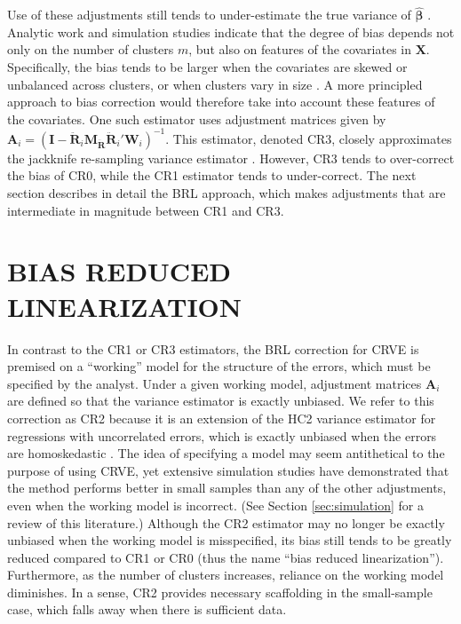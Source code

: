 \documentclass[draft]{ectaart}\usepackage[]{graphicx}\usepackage[]{color}
\newcommand{\bm}{\mathbf}
\newcommand{\bs}{\boldsymbol}
\begin{document}
Use of these adjustments still tends to under-estimate the true variance of $\hat{\bs\beta}$ \citep{Cameron2015practitioners}. 
Analytic work and simulation studies indicate that the degree of bias depends not only on the number of clusters $m$, but also on features of the covariates in $\bm{X}$. Specifically, 
the bias tends to be larger when the covariates are skewed or unbalanced across clusters, or when clusters vary in size \citep{Carter2013asymptotic, MacKinnon2013thirty}. 
A more principled approach to bias correction would therefore take into account these features of the covariates. 
One such estimator uses adjustment matrices given by $\bm{A}_i = \left(\bm{I} - \bm{\ddot{R}}_i \bm{M_{\ddot{R}}}\bm{\ddot{R}}_i'\bm{W}_i\right)^{-1}$. This estimator, denoted CR3, closely approximates the jackknife re-sampling variance estimator \citep{Bell2002bias, Mancl2001covariance}.  
However, CR3 tends to over-correct the bias of CR0, while the CR1 estimator tends to under-correct. 
The next section describes in detail the BRL approach, which makes adjustments that are intermediate in magnitude between CR1 and CR3. 


\section{BIAS REDUCED LINEARIZATION}
\label{sec:BRL}

In contrast to the CR1 or CR3 estimators, the BRL correction for CRVE is premised on a ``working'' model for the structure of the errors, which must be specified by the analyst. 
Under a given working model, adjustment matrices $\bm{A}_i$ are defined so that the variance estimator is exactly unbiased.
We refer to this correction as CR2 because it is an extension of the HC2 variance estimator for regressions with uncorrelated errors, which is exactly unbiased when the errors are homoskedastic \citep{MacKinnon1985some}.
The idea of specifying a model may seem antithetical to the purpose of using CRVE, yet extensive simulation studies have demonstrated that the method performs better in small samples than any of the other adjustments, even when the working model is incorrect. (See Section \ref{sec:simulation} for a review of this literature.) 
Although the CR2 estimator may no longer be exactly unbiased when the working model is misspecified, its bias still tends to be greatly reduced compared to CR1 or CR0 (thus the name ``bias reduced linearization''). Furthermore, as the number of clusters increases, reliance on the working model diminishes. 
In a sense, CR2 provides necessary scaffolding in the small-sample case, which falls away when there is sufficient data.
\end{document}
